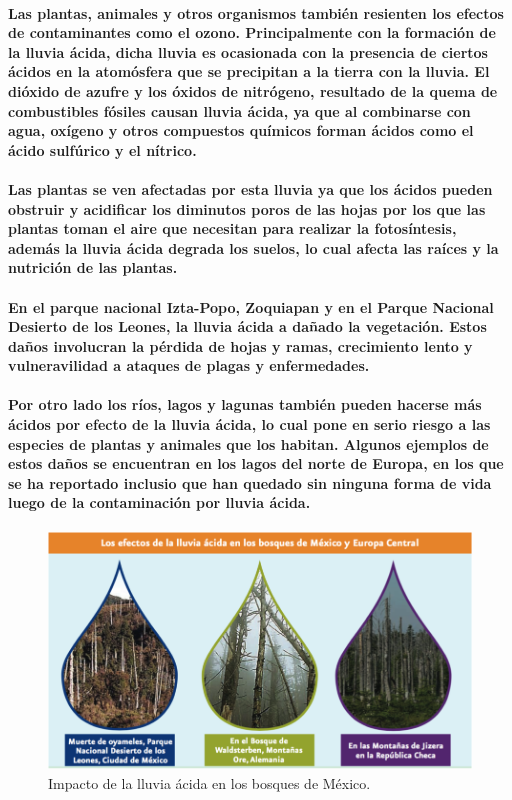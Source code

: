     \paragraph {Las plantas, animales y otros organismos también resienten los efectos de contaminantes como el ozono. Principalmente con la formación de la lluvia ácida, dicha lluvia es ocasionada con la presencia de ciertos ácidos en la atomósfera que se precipitan a la tierra con la lluvia. El dióxido de azufre y los óxidos de nitrógeno, resultado de la quema de combustibles  fósiles causan lluvia ácida, ya que al combinarse con agua, oxígeno y otros compuestos químicos forman ácidos como el ácido sulfúrico y el nítrico. }
    \paragraph{Las plantas se ven afectadas por esta lluvia ya que los ácidos pueden obstruir y acidificar los diminutos poros de las hojas por los que las plantas toman el aire que necesitan para realizar la fotosíntesis, además la lluvia ácida degrada los suelos, lo cual afecta las raíces y la nutrición de las plantas.}
  
    \paragraph {En el parque nacional Izta-Popo, Zoquiapan y en el Parque Nacional Desierto de los Leones, la lluvia ácida a dañado la vegetación. Estos daños involucran la pérdida de hojas y ramas, crecimiento lento y vulneravilidad a ataques de plagas y enfermedades.}
  
    \paragraph {Por otro lado los ríos, lagos y lagunas también pueden hacerse más ácidos por efecto de la lluvia ácida, lo cual pone en serio riesgo a las especies de plantas y animales que los habitan. Algunos ejemplos de estos daños se encuentran en los lagos del norte de Europa, en los que se ha reportado inclusio que han quedado sin ninguna forma de vida luego de la contaminación por lluvia ácida.}

    \begin{figure}[h!]
      \centering
        \includegraphics[width=\textwidth]{./images/2.png}      
      \caption{Impacto de la lluvia ácida en los bosques de México.}
    \end{figure}    

